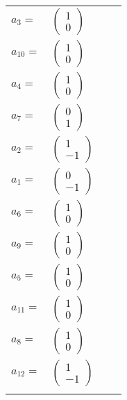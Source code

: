 \documentclass[1p]{elsarticle_modified}
\theoremstyle{definition}
\begin{document}
\begin{tabular}{m{7pt} m{180pt} m{7pt} m{180pt} }
\flushright $a_{3}=$&$\begin{pmatrix}1\\0\end{pmatrix}$ \\
\flushright $a_{10}=$&$\begin{pmatrix}1\\0\end{pmatrix}$ \\
\flushright $a_{4}=$&$\begin{pmatrix}1\\0\end{pmatrix}$ \\
\flushright $a_{7}=$&$\begin{pmatrix}0\\1\end{pmatrix}$ \\
\flushright $a_{2}=$&$\begin{pmatrix}1\\-1\end{pmatrix}$ \\
\flushright $a_{1}=$&$\begin{pmatrix}0\\-1\end{pmatrix}$ \\
\flushright $a_{6}=$&$\begin{pmatrix}1\\0\end{pmatrix}$ \\
\flushright $a_{9}=$&$\begin{pmatrix}1\\0\end{pmatrix}$ \\
\flushright $a_{5}=$&$\begin{pmatrix}1\\0\end{pmatrix}$ \\
\flushright $a_{11}=$&$\begin{pmatrix}1\\0\end{pmatrix}$ \\
\flushright $a_{8}=$&$\begin{pmatrix}1\\0\end{pmatrix}$ \\
\flushright $a_{12}=$&$\begin{pmatrix}1\\-1\end{pmatrix}$\\&\end{tabular}
\end{document}
